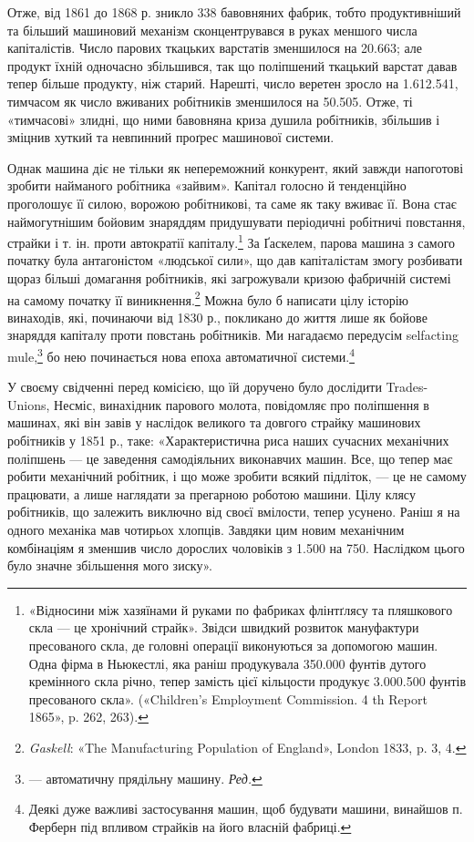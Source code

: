 Отже, від 1861 до 1868 р. зникло 338 бавовняних фабрик, тобто
продуктивніший та більший машиновий механізм сконцентрувався
в руках меншого числа капіталістів. Число парових ткацьких
варстатів зменшилося на \num{20.663}; але продукт їхній одночасно
збільшився, так що поліпшений ткацький варстат давав
тепер більше продукту, ніж старий. Нарешті, число веретен
зросло на \num{1.612.541}, тимчасом як число вживаних робітників
зменшилося на \num{50.505}. Отже, ті «тимчасові» злидні, що ними бавовняна
криза душила робітників, збільшив і зміцнив хуткий
та невпинний проґрес машинової системи.

Однак машина діє не тільки як непереможний конкурент,
який завжди напоготові зробити найманого робітника «зайвим».
Капітал голосно й тенденційно проголошує її силою, ворожою
робітникові, та саме як таку вживає її. Вона стає наймогутнішим
бойовим знаряддям придушувати періодичні робітничі повстання,
страйки і т. ін. проти автократії капіталу.\footnote{
«Відносини між хазяїнами й руками по фабриках флінтґлясу та пляшкового
скла — це хронічний страйк». Звідси швидкий розвиток мануфактури
пресованого скла, де головні операції виконуються за допомогою машин.
Одна фірма в Ньюкестлі, яка раніш продукувала \num{350.000} фунтів дутого
кремінного скла річно, тепер замість цієї кільцости продукує \num{3.000.500}
фунтів пресованого скла». («Children’s Employment Commission. 4 th
Report 1865», p. 262, 263).
} За Ґаскелем,
парова машина з самого початку була антагоністом «людської
сили», що дав капіталістам змогу розбивати щораз більші
домагання робітників, які загрожували кризою фабричній системі
на самому початку її виникнення.\footnote{
\emph{Gaskell}: «The Manufacturing Population of England», London
1833, p. 3, 4.
} Можна було б написати
цілу історію винаходів, які, починаючи від 1830 р., покликано
до життя лише як бойове знаряддя капіталу проти повстань робітників.
Ми нагадаємо передусім selfacting mule,\footnote*{
— автоматичну прядільну машину. \emph{Ред.}
} бо нею починається
нова епоха автоматичної системи.\footnote{
Деякі дуже важливі застосування машин, щоб будувати машини,
винайшов п. Ферберн під впливом страйків на його власній фабриці.
}

У своєму свідченні перед комісією, що їй доручено було дослідити
Trades-Unions, Несміс, винахідник парового молота, повідомляє
про поліпшення в машинах, які він завів у наслідок
великого та довгого страйку машинових робітників у 1851 р.,
таке: «Характеристична риса наших сучасних механічних поліпшень
— це заведення самодіяльних виконавчих машин. Все, що
тепер має робити механічний робітник, і що може зробити всякий
підліток, — це не самому працювати, а лише наглядати за прегарною
роботою машини. Цілу клясу робітників, що залежить
виключно від своєї вмілости, тепер усунено. Раніш я на одного
механіка мав чотирьох хлопців. Завдяки цим новим механічним
комбінаціям я зменшив число дорослих чоловіків з \num{1.500} на 750.
Наслідком цього було значне збільшення мого зиску».

